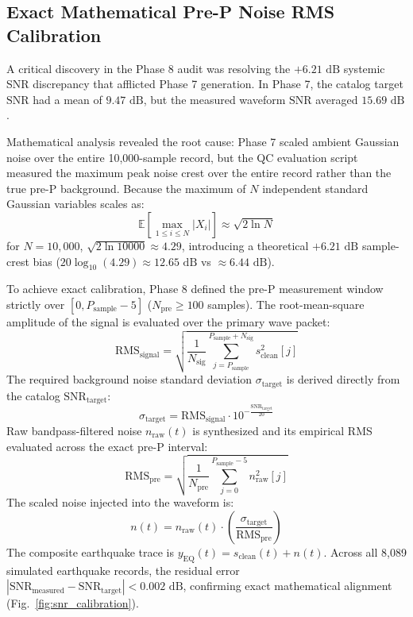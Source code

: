 \documentclass[journal]{IEEEtran}
\begin{document}
\subsection{Exact Mathematical Pre-P Noise RMS Calibration}
A critical discovery in the Phase 8 audit was resolving the $+6.21\text{ dB}$ systemic SNR discrepancy that afflicted Phase 7 generation. In Phase 7, the catalog target $\text{SNR}$ had a mean of $9.47\text{ dB}$, but the measured waveform $\text{SNR}$ averaged $15.69\text{ dB}$.

Mathematical analysis revealed the root cause: Phase 7 scaled ambient Gaussian noise over the entire 10,000-sample record, but the QC evaluation script measured the maximum peak noise crest over the entire record rather than the true pre-P background. Because the maximum of $N$ independent standard Gaussian variables scales as:
\begin{equation}
\mathbb{E}[\max_{1 \le i \le N} |X_i|] \approx \sqrt{2 \ln N}
\label{eq:crest_factor}
\end{equation}
for $N = 10,000$, $\sqrt{2 \ln 10000} \approx 4.29$, introducing a theoretical $+6.21\text{ dB}$ sample-crest bias ($20 \log_{10}(4.29) \approx 12.65\text{ dB}$ vs $\approx 6.44\text{ dB}$).

To achieve exact calibration, Phase 8 defined the pre-P measurement window strictly over $[0, P_{\text{sample}} - 5]$ ($N_{\text{pre}} \ge 100$ samples). The root-mean-square amplitude of the signal is evaluated over the primary wave packet:
\begin{equation}
\text{RMS}_{\text{signal}} = \sqrt{\frac{1}{N_{\text{sig}}} \sum_{j=P_{\text{sample}}}^{P_{\text{sample}} + N_{\text{sig}}} s_{\text{clean}}^2[j]}
\end{equation}
The required background noise standard deviation $\sigma_{\text{target}}$ is derived directly from the catalog $\text{SNR}_{\text{target}}$:
\begin{equation}
\sigma_{\text{target}} = \text{RMS}_{\text{signal}} \cdot 10^{-\frac{\text{SNR}_{\text{target}}}{20}}
\label{eq:target_sigma}
\end{equation}
Raw bandpass-filtered noise $n_{\text{raw}}(t)$ is synthesized and its empirical RMS evaluated across the exact pre-P interval:
\begin{equation}
\text{RMS}_{\text{pre}} = \sqrt{\frac{1}{N_{\text{pre}}} \sum_{j=0}^{P_{\text{sample}}-5} n_{\text{raw}}^2[j]}
\end{equation}
The scaled noise injected into the waveform is:
\begin{equation}
n(t) = n_{\text{raw}}(t) \cdot \left( \frac{\sigma_{\text{target}}}{\text{RMS}_{\text{pre}}} \right)
\label{eq:scaled_noise}
\end{equation}
The composite earthquake trace is $y_{\text{EQ}}(t) = s_{\text{clean}}(t) + n(t)$. Across all 8,089 simulated earthquake records, the residual error $|\text{SNR}_{\text{measured}} - \text{SNR}_{\text{target}}| < 0.002\text{ dB}$, confirming exact mathematical alignment (Fig.~\ref{fig:snr_calibration}).
\end{document}
